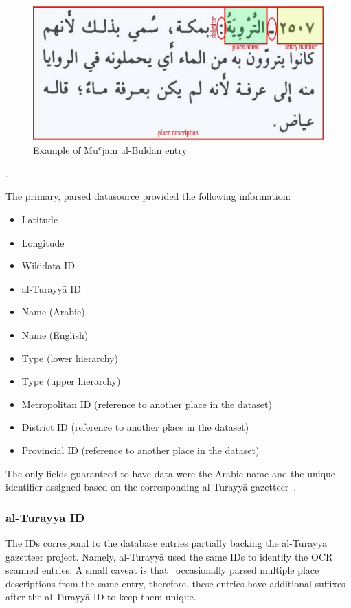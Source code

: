\begin{figure}[h] %
    \centering %
    \includegraphics[width=0.8\linewidth]{figures/yaqut-layout} %
    \caption{Example of Muʿjam al-Buldān entry ~\cite{YaqutRB}} %
    \label{fig:yaqut-structure} %
\end{figure}.

The primary, parsed datasource provided the following information:
\begin{itemize}
    \item Latitude
    \item Longitude
    \item Wikidata ID
    \item al-Turayyā ID~\cite{AlTurayya}
    \item Name (Arabic)
    \item Name (English)
    \item Type (lower hierarchy)
    \item Type (upper hierarchy)
    \item Metropolitan ID (reference to another place in the dataset)
    \item District ID (reference to another place in the dataset)
    \item Provincial ID (reference to another place in the dataset)
\end{itemize}


The only fields guaranteed to have data were the Arabic name and the unique identifier assigned based on the corresponding al-Turayyā gazetteer~\cite{AlTurayya}.

\subsubsection{al-Turayyā ID}
The IDs correspond to the database entries partially backing the al-Turayyā gazetteer project.
Namely, al-Turayyā used the same IDs to identify the OCR scanned entries.
A small caveat is that~\cite{YaqutRB} occasionally parsed multiple place descriptions from the same entry,
therefore, these entries have additional suffixes after the al-Turayyā ID to keep them unique.

